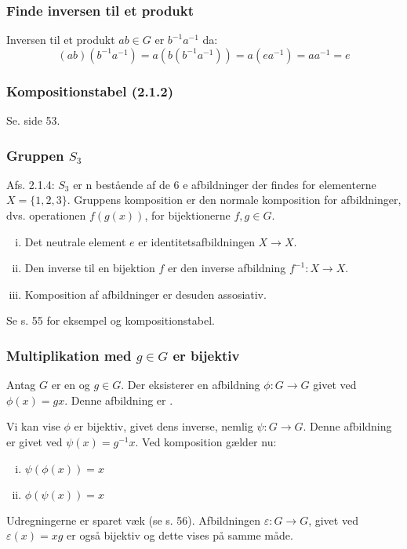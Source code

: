 \subsubsection{Finde inversen til et produkt}
Inversen til et produkt $ab \in G$ er $b^{-1}a^{-1}$ da:
\begin{equation*}
  (ab)(b^{-1}a^{-1}) = a(b(b^{-1}a^{-1})) = a(ea^{-1}) = aa^{-1} = e
\end{equation*}

\subsubsection{Kompositionstabel (2.1.2)}
Se. side 53.

\subsubsection{Gruppen $S_3$}
\label{Gruppen S_3}
Afs. 2.1.4: $S_3$ er n bestående af de 6 e
afbildninger der findes for elementerne $X = \{1,2,3\}$. Gruppens komposition
er den normale komposition for afbildninger, dvs. operationen $f(g(x))$, for
bijektionerne $f, g \in G$. \begin{enumerate}[(i)]
  \item Det neutrale element $e$ er identitetsafbildningen $X \rightarrow X$.
  \item Den inverse til en bijektion $f$ er den inverse afbildning $f^{-1}: X
  \rightarrow X$.
  \item Komposition af afbildninger er desuden assosiativ.
\end{enumerate}
Se s. 55 for eksempel og kompositionstabel.

\subsubsection{Multiplikation med $g \in G$ er bijektiv}
Antag $G$ er en  og $g \in G$. Der eksisterer en afbildning
$\phi:G\rightarrow G$ givet ved $\phi(x) = gx$. Denne afbildning er
.

Vi kan vise $\phi$ er bijektiv, givet dens inverse, nemlig $\psi: G
\rightarrow G$. Denne afbildning er givet ved $\psi(x) = g^{-1}x$. Ved
komposition gælder nu:
\begin{enumerate}[(i)]
  \item $\psi(\phi(x)) = x$
  \item $\phi(\psi(x)) = x$
\end{enumerate}
Udregningerne er sparet væk (se s. 56). Afbildningen $\varepsilon : G
\rightarrow G$, givet ved $\varepsilon(x) = xg$ er også bijektiv og dette vises
på samme måde.

